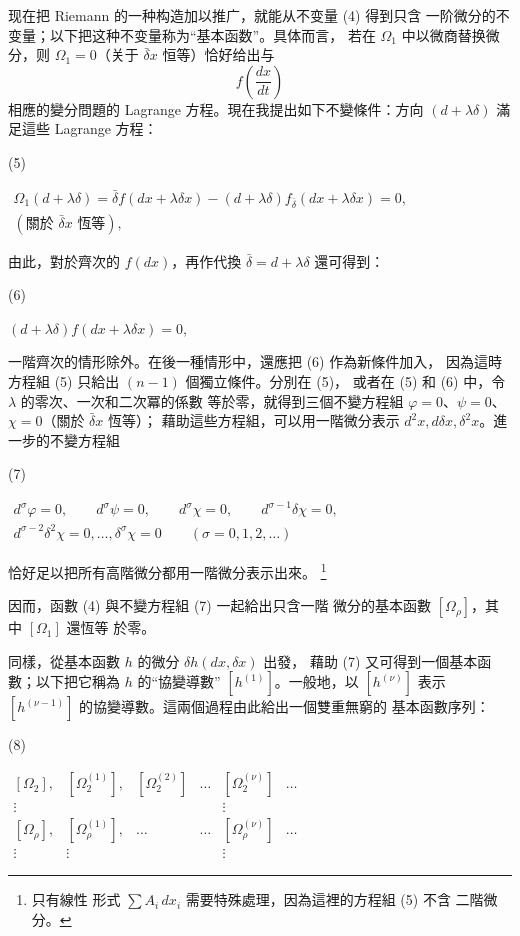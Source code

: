 \documentclass[11pt]{article}
\providecommand{\bdelta}{\bar{\delta}}
\providecommand{\srcfn}[2]{%
  \begingroup
  \renewcommand{\thefootnote}{#1}%
  \footnote{#2}%
  \addtocounter{footnote}{-1}%
  \endgroup}
\providecommand{\srcnumdisplay}[3][3.4em]{%
  \par\smallskip\noindent
  \begin{minipage}[t]{#1}\vspace*{0pt}#2\end{minipage}%
  \begin{minipage}[t]{\dimexpr\linewidth-#1\relax}\vspace*{0pt}\centering
  \(\displaystyle #3\)
  \end{minipage}\par\smallskip}
\begin{document}
现在把 Riemann 的一种构造加以推广，就能从不变量 (4) 得到只含
一阶微分的不变量；以下把这种不变量称为“基本函数”。具体而言，
若在 \(\Omega_1\) 中以微商替换微分，则 \(\Omega_1=0\)（关于
\(\bdelta x\) 恒等）恰好给出与
\[
f\!\left(\frac{dx}{dt}\right)
\]
相應的變分問題的 Lagrange 方程。現在我提出如下不變條件：方向
\((d+\lambda\delta)\) 滿足這些 Lagrange 方程：
\srcnumdisplay{(5)}{%
\begin{gathered}
\Omega_1(d+\lambda\delta)=
\bdelta f(dx+\lambda\delta x)
-(d+\lambda\delta)f_{\bdelta}(dx+\lambda\delta x)=0,\\
(\text{關於 }\bdelta x\text{ 恆等}),
\end{gathered}
}
由此，對於齊次的 \(f(dx)\)，再作代換 \(\bdelta=d+\lambda\delta\)
還可得到：
\srcnumdisplay{(6)}{%
(d+\lambda\delta)f(dx+\lambda\delta x)=0,
}
一階齊次的情形除外。在後一種情形中，還應把 (6) 作為新條件加入，
因為這時方程組 (5) 只給出 \((n-1)\) 個獨立條件。分別在 (5)，
或者在 (5) 和 (6) 中，令 \(\lambda\) 的零次、一次和二次冪的係數
等於零，就得到三個不變方程組
\(\varphi=0\)、\(\psi=0\)、\(\chi=0\)（關於 \(\bdelta x\) 恆等）；
藉助這些方程組，可以用一階微分表示
\(d^2x,d\delta x,\delta^2x\)。進一步的不變方程組
\srcnumdisplay{(7)}{%
\begin{gathered}
d^\sigma\varphi=0,\qquad d^\sigma\psi=0,\qquad
d^\sigma\chi=0,\qquad d^{\sigma-1}\delta\chi=0,\\
d^{\sigma-2}\delta^2\chi=0,\ldots,\delta^\sigma\chi=0
\qquad(\sigma=0,1,2,\ldots)
\end{gathered}
}
恰好足以把所有高階微分都用一階微分表示出來。\srcfn{1)}{只有線性
形式 \(\sum A_i\,dx_i\) 需要特殊處理，因為這裡的方程組 (5) 不含
二階微分。} 因而，函數 (4) 與不變方程組 (7) 一起給出只含一階
微分的基本函數 \([\Omega_\rho]\)，其中 \([\Omega_1]\) 還恆等
於零。

同樣，從基本函數 \(h\) 的微分 \(\delta h(dx,\delta x)\) 出發，
藉助 (7) 又可得到一個基本函數；以下把它稱為 \(h\) 的“協變導數”
\([h^{(1)}]\)。一般地，以 \([h^{(\nu)}]\) 表示
\([h^{(\nu-1)}]\) 的協變導數。這兩個過程由此給出一個雙重無窮的
基本函數序列：
\srcnumdisplay{(8)}{%
\begin{array}{cccccc}
[\Omega_2], & [\Omega_2^{(1)}], & [\Omega_2^{(2)}] & \ldots
& [\Omega_2^{(\nu)}] & \ldots\\
\vdots &&&& \vdots&\\
{}[\Omega_\rho], & [\Omega_\rho^{(1)}], & \ldots & \ldots
& [\Omega_\rho^{(\nu)}] & \ldots\\
\vdots & \vdots &&& \vdots&
\end{array}
}
\end{document}
